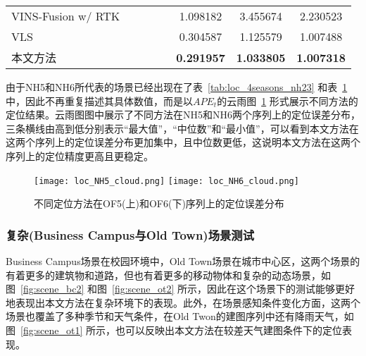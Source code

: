 \begin{table}
\begin{tabular}{lccccccc}
VINS-Fusion w/ RTK &                                                                                &                     &                     &                     & 1.098182          & 3.455674          & 2.230523          \\
VLS                &                                                                                &                     &                     &                     & 0.304587          & 1.125579          & 1.007488          \\
本文方法               &                                                                                &                     &                     &                     & \cellcolor[HTML]{FFCCC9}\textbf{0.291957} & \cellcolor[HTML]{FFCCC9}\textbf{1.033805} & \cellcolor[HTML]{FFCCC9}\textbf{1.007318} \\ \bottomrule
\end{tabular}
\label{tab:loc_4seasons_nh47}
\end{table}

由于NH5和NH6所代表的场景已经出现在了表~\ref{tab:loc_4seasons_nh23} 和表~\ref{tab:loc_4seasons_nh47} 中，因此不再重复描述其具体数值，而是以$APE_t$的云雨图~\ref{fig:loc_4seaons_nh5} 形式展示不同方法的定位结果。云雨图图中展示了不同方法在NH5和NH6两个序列上的定位误差分布，三条横线由高到低分别表示“最大值”，“中位数”和“最小值”，可以看到本文方法在这两个序列上的定位误差分布更加集中，且中位数更低，这说明本文方法在这两个序列上的定位精度更高且更稳定。

\begin{figure}
  \centering
  \texttt{[image: loc\_NH5\_cloud.png]}
  \texttt{[image: loc\_NH6\_cloud.png]}
  \caption{不同定位方法在OF5(上)和OF6(下)序列上的定位误差分布}
  \label{fig:loc_4seaons_nh5}
\end{figure}


\subsubsection{复杂(Business Campus与Old Town)场景测试}

Business Campus场景在校园环境中，Old Town场景在城市中心区，这两个场景的有着更多的建筑物和道路，但也有着更多的移动物体和复杂的动态场景，如图~\ref{fig:scene_bc2} 和图~\ref{fig:scene_ot2} 所示，因此在这个场景下的测试能够更好地表现出本文方法在复杂环境下的表现。此外，在场景感知条件变化方面，这两个场景也覆盖了多种季节和天气条件，在Old Twon的建图序列中还有降雨天气，如图~\ref{fig:scene_ot1} 所示，也可以反映出本文方法在较差天气建图条件下的定位表现。

